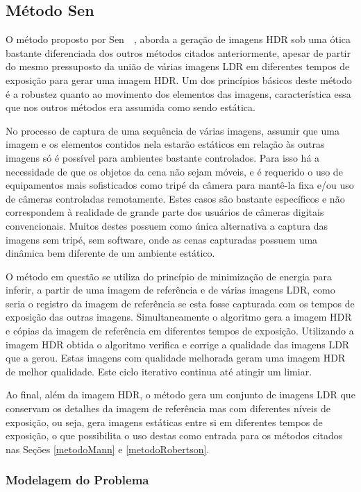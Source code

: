 \subsection{Método Sen} \label{metodoSen}

O método proposto por Sen~\etal~\cite{hdrMovimento}, aborda a geração de imagens HDR sob uma ótica bastante diferenciada dos outros métodos citados anteriormente, apesar de partir do mesmo pressuposto da união de várias imagens LDR em diferentes tempos de exposição para gerar uma imagem HDR. Um dos princípios básicos deste método é a robustez quanto ao movimento dos elementos das imagens, característica essa que nos outros métodos era assumida como sendo estática.

No processo de captura de uma sequência de várias imagens, assumir que uma imagem e os elementos contidos nela estarão estáticos em relação às outras imagens só é possível para ambientes bastante controlados. Para isso há a necessidade de que os objetos da cena não sejam móveis, e é requerido o uso de equipamentos mais sofisticados como tripé da câmera para mantê-la fixa e/ou uso de câmeras controladas remotamente. Estes casos são bastante específicos e não correspondem à realidade de grande parte dos usuários de câmeras digitais convencionais. Muitos destes possuem como única alternativa a captura das imagens sem tripé, sem software, onde as cenas capturadas possuem uma dinâmica bem diferente de um ambiente estático.

O método em questão se utiliza do princípio de minimização de energia para inferir, a partir de uma imagem de referência e de várias imagens LDR, como seria o registro da imagem de referência se esta fosse capturada com os tempos de exposição das outras imagens. Simultaneamente o algoritmo gera a imagem HDR e cópias da imagem de referência em diferentes tempos de exposição. Utilizando a imagem HDR obtida o algoritmo verifica e corrige a qualidade das imagens LDR que a gerou. Estas imagens com qualidade melhorada geram uma imagem HDR de melhor qualidade. Este ciclo iterativo continua até atingir um limiar.

Ao final, além da imagem HDR, o método gera um conjunto de imagens LDR que conservam os detalhes da imagem de referência mas com diferentes níveis de exposição, ou seja, gera imagens estáticas entre si em diferentes tempos de exposição, o que possibilita o uso destas como entrada para os métodos citados nas Seções \ref{metodoMann} e \ref{metodoRobertson}.

\subsubsection{Modelagem do Problema} \label{MetodoSenModelo}

